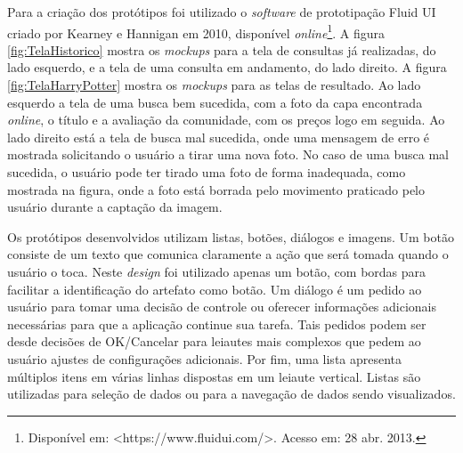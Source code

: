 


Para a criação dos protótipos foi utilizado o \emph{software} de 
prototipação Fluid UI criado por Kearney e Hannigan em 2010,
disponível \emph{online}\footnote{Disponível em:
<https://www.fluidui.com/>. Acesso em: 28 abr. 2013.}.
A figura \ref{fig:TelaHistorico} mostra os \emph{mockups} para a tela de
consultas já realizadas, do lado esquerdo, e a tela de uma
consulta em andamento, do lado direito.  A figura
 \ref{fig:TelaHarryPotter} mostra os \emph{mockups} para as telas de resultado.
 Ao lado esquerdo a tela de uma busca bem sucedida, com a foto
 da capa encontrada \emph{online}, o título e a avaliação da
 comunidade, com os preços logo em seguida.  Ao lado direito
 está a tela de busca mal sucedida, onde uma mensagem de erro é mostrada
 solicitando o usuário a tirar uma nova foto.  No caso de uma busca mal
 sucedida, o usuário pode ter tirado uma foto de forma inadequada,
 como mostrada na figura, onde a foto está borrada pelo movimento
 praticado pelo usuário durante a captação da imagem.

Os protótipos desenvolvidos utilizam listas, botões, diálogos e imagens.
Um botão consiste de um texto que comunica claramente a ação que será
tomada quando o usuário o toca.   Neste \emph{design} foi utilizado apenas
um botão, com bordas para facilitar a identificação do artefato como
botão.  
Um diálogo é um pedido ao usuário para tomar uma decisão de controle ou
oferecer informações adicionais necessárias para que a aplicação continue
sua tarefa.  Tais pedidos podem ser desde decisões de OK/Cancelar para
leiautes mais complexos que pedem ao usuário ajustes de configurações
adicionais. Por fim,
uma lista apresenta múltiplos itens em várias linhas dispostas em um
leiaute vertical.  Listas são utilizadas para seleção de dados ou para
a navegação de dados sendo visualizados.

